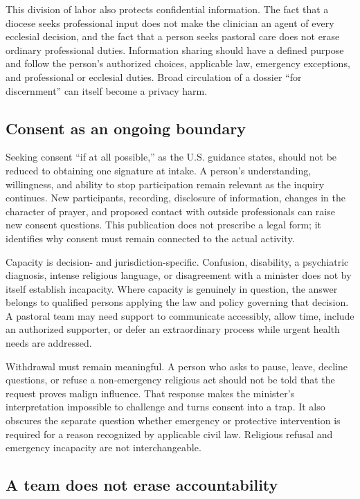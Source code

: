 This division of labor also protects confidential information. The fact that a
diocese seeks professional input does not make the clinician an agent of every
ecclesial decision, and the fact that a person seeks pastoral care does not
erase ordinary professional duties. Information sharing should have a defined
purpose and follow the person's authorized choices, applicable law, emergency
exceptions, and professional or ecclesial duties. Broad circulation of a
dossier ``for discernment'' can itself become a privacy harm.

\subsection{Consent as an ongoing boundary}

Seeking consent ``if at all possible,'' as the U.S. guidance states, should
not be reduced to obtaining one signature at intake. A person's understanding,
willingness, and ability to stop participation remain relevant as the inquiry
continues. New participants, recording, disclosure of information, changes in
the character of prayer, and proposed contact with outside professionals can
raise new consent questions. This publication does not prescribe a legal form;
it identifies why consent must remain connected to the actual activity.

Capacity is decision- and jurisdiction-specific. Confusion, disability, a
psychiatric diagnosis, intense religious language, or disagreement with a
minister does not by itself establish incapacity. Where capacity is genuinely
in question, the answer belongs to qualified persons applying the law and
policy governing that decision. A pastoral team may need support to communicate
accessibly, allow time, include an authorized supporter, or defer an
extraordinary process while urgent health needs are addressed.

Withdrawal must remain meaningful. A person who asks to pause, leave, decline
questions, or refuse a non-emergency religious act should not be told that the
request proves malign influence. That response makes the minister's
interpretation impossible to challenge and turns consent into a trap. It also
obscures the separate question whether emergency or protective intervention
is required for a reason recognized by applicable civil law. Religious refusal
and emergency incapacity are not interchangeable.

\subsection{A team does not erase accountability}

